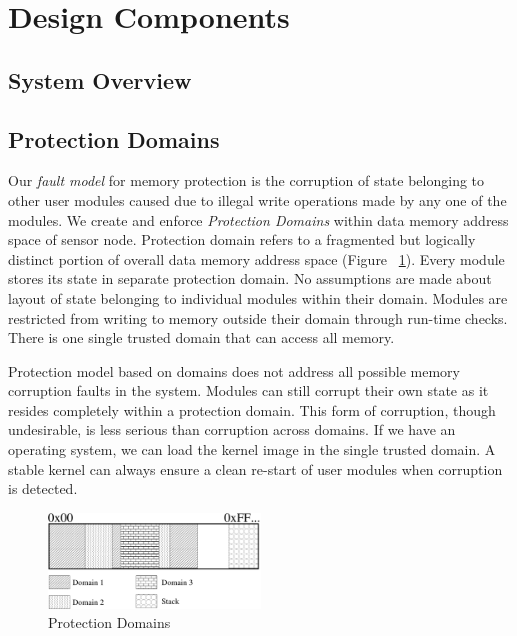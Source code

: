 \section{Design Components}
\label{sec:design}
%
%
\subsection{System Overview}
%

%


%
\subsection{Protection Domains}
%
Our \textit{fault model} for memory protection is the corruption of state belonging to other user modules caused due to illegal write operations made by any one of the modules.
%
We create and enforce \emph{Protection Domains} within data memory address space of sensor node.
%
Protection domain refers to a fragmented but logically distinct portion of overall data memory address space (Figure ~\ref{fig:prot_domains}).
%
Every module stores its state in separate protection domain.
%
No assumptions are made about layout of state belonging to individual modules within their domain.
%
Modules are restricted from writing to memory outside their domain through run-time checks.
%
There is one single trusted domain that can access all memory.
%

Protection model based on domains does not address all possible memory corruption faults in the system.
%
Modules can still corrupt their own state as it resides completely within a protection domain. 
%
This form of corruption, though undesirable, is less serious than corruption across domains.
%
If we have an operating system, we can load the kernel image in the single trusted domain.
%
A stable kernel can always ensure a clean re-start of user modules when corruption is detected.
%
\begin{figure}[htbp]
   \centering
   \includegraphics[height = 1in, keepaspectratio=true]{figures/domains.pdf} 
   \caption{Protection Domains}
   \label{fig:prot_domains}
\end{figure}
%
